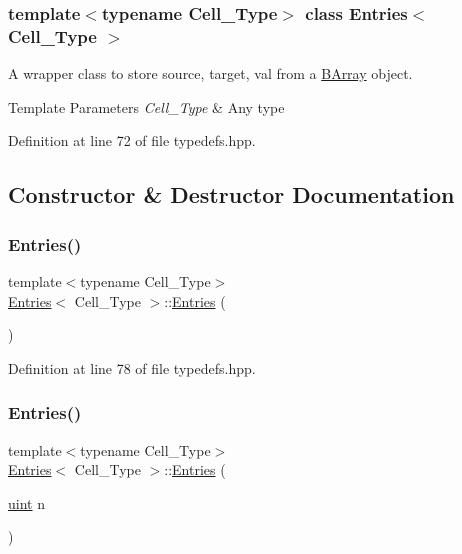 \subsubsection*{template$<$typename Cell\+\_\+\+Type$>$\newline
class Entries$<$ Cell\+\_\+\+Type $>$}

A wrapper class to store {\ttfamily source}, {\ttfamily target}, {\ttfamily val} from a {\ttfamily \hyperlink{class_b_array}{B\+Array}} object. 


\begin{DoxyTemplParams}{Template Parameters}
{\em Cell\+\_\+\+Type} & Any type \\
\hline
\end{DoxyTemplParams}


Definition at line 72 of file typedefs.\+hpp.



\subsection{Constructor \& Destructor Documentation}
\mbox{\label{class_entries_a9e6cba5965f285beb3c0356c79f592d2}} 
\subsubsection{\texorpdfstring{Entries()}{Entries()}\hspace{0.1cm}{\footnotesize\ttfamily [1/2]}}
{\footnotesize\ttfamily template$<$typename Cell\+\_\+\+Type$>$ \\
\hyperlink{class_entries}{Entries}$<$ Cell\+\_\+\+Type $>$\+::\hyperlink{class_entries}{Entries} (\begin{DoxyParamCaption}{ }\end{DoxyParamCaption})\hspace{0.3cm}{\ttfamily [inline]}}



Definition at line 78 of file typedefs.\+hpp.

\mbox{\label{class_entries_a03249234a765e3363ae89dba76b3ff9f}} 
\subsubsection{\texorpdfstring{Entries()}{Entries()}\hspace{0.1cm}{\footnotesize\ttfamily [2/2]}}
{\footnotesize\ttfamily template$<$typename Cell\+\_\+\+Type$>$ \\
\hyperlink{class_entries}{Entries}$<$ Cell\+\_\+\+Type $>$\+::\hyperlink{class_entries}{Entries} (\begin{DoxyParamCaption}\item[{\hyperlink{typedefs_8hpp_a91ad9478d81a7aaf2593e8d9c3d06a14}{uint}}]{n }\end{DoxyParamCaption})\hspace{0.3cm}{\ttfamily [inline]}}



